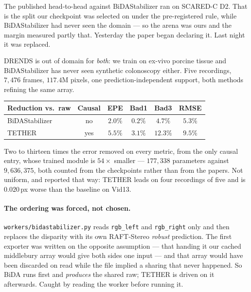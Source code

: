 \documentclass[11pt,a4paper]{article}
\begin{document}
The published head-to-head against BiDAStabilizer ran on SCARED-C D2. That
is the split our checkpoint was selected on under the pre-registered rule,
while BiDAStabilizer had never seen the domain --- so the arena was ours and
the margin measured partly that. Yesterday the paper began declaring it. Last
night it was replaced.

DRENDS is out of domain for \emph{both}: we train on ex-vivo porcine tissue
and BiDAStabilizer has never seen synthetic colonoscopy either. Five
recordings, $7{,}476$ frames, $117.4$M pixels, one prediction-independent
support, both methods refining the same array.

\begin{center}
\begin{tabular}{lccccc}
\toprule
Reduction vs.\ raw & Causal & EPE & Bad1 & Bad3 & RMSE \\
\midrule
BiDAStabilizer & no  & $2.0\%$ & $0.2\%$ & $4.7\%$ & $5.3\%$ \\
TETHER         & yes & $\mathbf{5.5\%}$ & $\mathbf{3.1\%}$ & $\mathbf{12.3\%}$ & $\mathbf{9.5\%}$ \\
\bottomrule
\end{tabular}
\end{center}

Two to thirteen times the error removed on every metric, from the only causal
entry, whose trained module is $54\times$ smaller --- $177{,}338$ parameters
against $9{,}636{,}375$, both counted from the checkpoints rather than from
the papers. Not uniform, and reported that way: TETHER leads on four
recordings of five and is $0.020$\,px worse than the baseline on Vid13.

\paragraph{The ordering was forced, not chosen.} \texttt{workers/bidastabilizer.py}
reads \texttt{rgb\_left} and \texttt{rgb\_right} only and then replaces the
disparity with its own RAFT-Stereo \emph{robust} prediction. The first
exporter was written on the opposite assumption --- that handing it our
cached middlebury array would give both sides one input --- and that array
would have been discarded on read while the file implied a sharing that never
happened. So BiDA runs first and \emph{produces} the shared raw; TETHER is
driven on it afterwards. Caught by reading the worker before running it.
\end{document}
